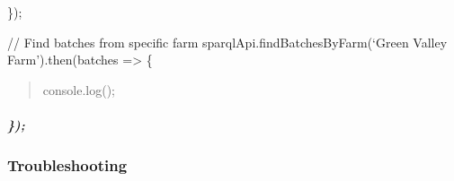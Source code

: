 \documentclass[letterpaper,10pt,english]{sphinxmanual}
\begin{document}
\sphinxAtStartPar
\});

\sphinxAtStartPar
// Find batches from specific farm
sparqlApi.findBatchesByFarm(‘Green Valley Farm’).then(batches =\textgreater{} \{
\begin{quote}

\sphinxAtStartPar
console.log();
\end{quote}


\subparagraph{\});}
\label{\detokenize{api/sparql-api:id176}}

\subsubsection{Troubleshooting}
\label{\detokenize{api/sparql-api:troubleshooting}}
\end{document}
